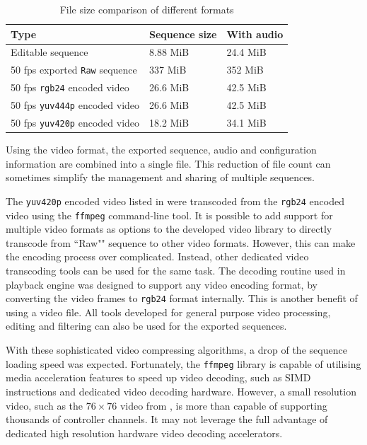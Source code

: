 \begin{table}[t]
  \centering
  \begin{tabular}{l|l|l}
    \hline
    \textbf{Type} & \textbf{Sequence size} & \textbf{With audio} \\
    \hline
    Editable sequence                     & 8.88 MiB  & 24.4 MiB  \\ \hline
    50 fps exported \texttt{Raw} sequence & 337 MiB   & 352 MiB   \\ \hline
    50 fps \texttt{rgb24} encoded video   & 26.6 MiB  & 42.5 MiB  \\ \hline
    50 fps \texttt{yuv444p} encoded video & 26.6 MiB  & 42.5 MiB  \\ \hline
    50 fps \texttt{yuv420p} encoded video & 18.2 MiB  & 34.1 MiB  \\ \hline
  \end{tabular}
  \caption{\footnotesize File size comparison of different formats}
  \label{tbl:size}
\end{table}

Using the video format, the exported sequence, audio and configuration information are combined into a single file. This reduction of file count can sometimes simplify the management and sharing of multiple sequences.

The \texttt{yuv420p} encoded video listed in  were transcoded from the \texttt{rgb24} encoded video using the \texttt{ffmpeg} command-line tool. It is possible to add support for multiple video formats as options to the developed video library to directly transcode from ``Raw"" sequence to other video formats. However, this can make the encoding process over complicated. Instead, other dedicated video transcoding tools can be used for the same task. The decoding routine used in playback engine was designed to support any video encoding format, by converting the video frames to \texttt{rgb24} format internally. This is another benefit of using a video file. All tools developed for general purpose video processing, editing and filtering can also be used for the exported sequences.

With these sophisticated video compressing algorithms, a drop of the sequence loading speed was expected. Fortunately, the \texttt{ffmpeg} library is capable of utilising media acceleration features to speed up video decoding, such as SIMD instructions and dedicated video decoding hardware. However, a small resolution video, such as the $76 \times 76$ video from , is more than capable of supporting thousands of controller channels. It may not leverage the full advantage of dedicated high resolution hardware video decoding accelerators.

